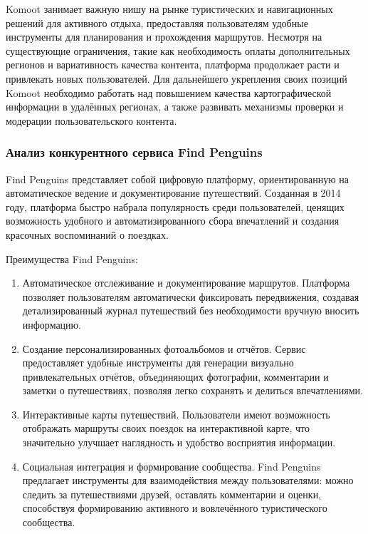 \noindent Komoot занимает важную нишу на рынке туристических и навигационных решений для активного отдыха, предоставляя пользователям удобные инструменты для планирования и прохождения маршрутов. Несмотря на существующие ограничения, такие как необходимость оплаты дополнительных регионов и вариативность качества контента, платформа продолжает расти и привлекать новых пользователей. Для дальнейшего укрепления своих позиций Komoot необходимо работать над повышением качества картографической информации в удалённых регионах, а также развивать механизмы проверки и модерации пользовательского контента.

\subsubsection*{Анализ конкурентного сервиса Find Penguins}
Find Penguins представляет собой цифровую платформу, ориентированную на автоматическое ведение и документирование путешествий. Созданная в 2014 году, платформа быстро набрала популярность среди пользователей, ценящих возможность удобного и автоматизированного сбора впечатлений и создания красочных воспоминаний о поездках.

Преимущества Find Penguins:
\begin{enumerate}
    \item Автоматическое отслеживание и документирование маршрутов. Платформа позволяет пользователям автоматически фиксировать передвижения, создавая детализированный журнал путешествий без необходимости вручную вносить информацию.
    \item Создание персонализированных фотоальбомов и отчётов. Сервис предоставляет удобные инструменты для генерации визуально привлекательных отчётов, объединяющих фотографии, комментарии и заметки о путешествиях, позволяя легко сохранять и делиться впечатлениями.
    \item Интерактивные карты путешествий. Пользователи имеют возможность отображать маршруты своих поездок на интерактивной карте, что значительно улучшает наглядность и удобство восприятия информации.
    \item Социальная интеграция и формирование сообщества. Find Penguins предлагает инструменты для взаимодействия между пользователями: можно следить за путешествиями друзей, оставлять комментарии и оценки, способствуя формированию активного и вовлечённого туристического сообщества.
\end{enumerate}

